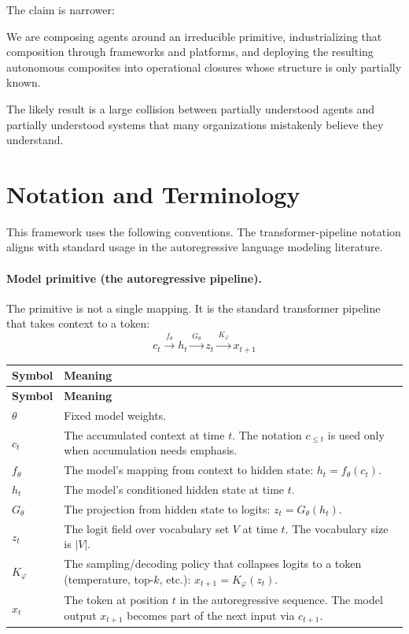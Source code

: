 \documentclass[11pt]{article}
\begin{document}
The claim is narrower:

\begin{pullquote}
We are composing agents around an irreducible primitive, industrializing that composition through frameworks and platforms, and deploying the resulting autonomous composites into operational closures whose structure is only partially known.
\end{pullquote}

The likely result is a large collision between partially understood agents and partially understood systems that many organizations mistakenly believe they understand.

\section{Notation and Terminology}

This framework uses the following conventions. The transformer-pipeline notation aligns with standard usage in the autoregressive language modeling literature.

\paragraph{Model primitive (the autoregressive pipeline).} The primitive is not a single mapping. It is the standard transformer pipeline that takes context to a token:
\[
c_t \xrightarrow{\,f_\theta\,} h_t \xrightarrow{\,G_\theta\,} z_t \xrightarrow{\,K_\varphi\,} x_{t+1}
\]

\renewcommand{\arraystretch}{1.25}
\begin{small}
\begin{longtable}{>{\raggedright\arraybackslash}p{2.2cm}>{\raggedright\arraybackslash}p{12.5cm}}
\toprule
\textbf{Symbol} & \textbf{Meaning} \\
\midrule
\endfirsthead
\toprule
\textbf{Symbol} & \textbf{Meaning} \\
\midrule
\endhead
$\theta$       & Fixed model weights. \\
$c_t$          & The accumulated context at time $t$. The notation $c_{\le t}$ is used only when accumulation needs emphasis. \\
$f_\theta$     & The model's mapping from context to hidden state: $h_t = f_\theta(c_t)$. \\
$h_t$          & The model's conditioned hidden state at time $t$. \\
$G_\theta$     & The projection from hidden state to logits: $z_t = G_\theta(h_t)$. \\
$z_t$          & The logit field over vocabulary set $V$ at time $t$. The vocabulary size is $|V|$. \\
$K_\varphi$    & The sampling/decoding policy that collapses logits to a token (temperature, top-$k$, etc.): $x_{t+1} = K_\varphi(z_t)$. \\
$x_t$          & The token at position $t$ in the autoregressive sequence. The model output $x_{t+1}$ becomes part of the next input via $c_{t+1}$. \\
\bottomrule
\end{longtable}
\end{small}
\end{document}
